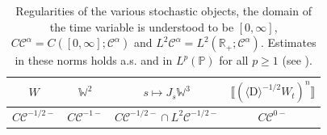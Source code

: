 \documentclass[11pt]{article}
\newcommand{\mathD}{\mathrm{D}}
\newcommand{\VV}{\mathscr{C}}
\begin{document}
\begin{table}[h]
  \begin{tabular}{cccc}
    $W$ & $\mathbb{W}^2$ & $s \mapsto J_s \mathbb{W}^3$ & $\llbracket
    (\langle \mathD \rangle^{- 1 / 2} W_t)^n \rrbracket$\\
    \hline
    $C \VV^{- 1 / 2 -}$ & $C \VV^{- 1 -}$ & $C \VV^{- 1 / 2 -} \cap L^2 \VV^{-
    1 / 2 -}$ & $C \VV^{0 -}$
  \end{tabular}
  \caption{\label{table:reg}Regularities of the various stochastic objects,
  the domain of the time variable is understood to be $[0, \infty]$, $C
  \VV^{\alpha} = C \left( [0, \infty] ; \VV^{\alpha} \right)$ and $L^2
  \VV^{\alpha} = L^2 \left( \mathbb{R}_+ ; \VV^{\alpha} \right)$. Estimates in
  these norms holds a.s. and in $L^p (\mathbb{P})$ for all $p \geqslant 1$
  (see {\cite{barashkov_gubinelli_variational}}).}
\end{table}
\end{document}
